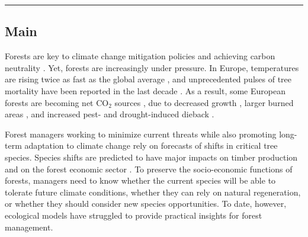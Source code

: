 \documentclass[11pt,letter]{article}
\begin{document}

\noindent\rule{\textwidth}{0.3pt}

\linenumbers

\subsection*{Main}

Forests are key to climate change mitigation policies and achieving carbon neutrality  \citep{Korosuo2023, Hyyrynen2023}. Yet, forests are increasingly under pressure. In Europe, temperatures are rising twice as fast as the global average \citep{CCCS2024}, and unprecedented pulses of tree mortality  have been reported in the last decade \citep{Senf2020}. As a result, some European forests are becoming net CO$_2$ sources \citep{Hadden2016, Karelin2021}, due to decreased growth \citep{Hadden2016, Woude2023}, larger burned areas \citep{Carnicer2022, Kelly2024}, and increased pest- and drought-induced dieback \citep{Karelin2021, Cienciala2024, Latifovic2024}. 

Forest managers working to minimize current threats while also promoting long-term adaptation to climate change rely on forecasts of shifts in critical tree species. Species shifts are predicted to have major impacts on timber production and on the forest economic sector \citep{Wessely2024, Hanewinkel2013}. To preserve the socio-economic functions of forests, managers need to know whether the current species will be able to tolerate future climate conditions, whether they can rely on natural regeneration, or whether they should consider new species opportunities. To date, however, ecological models have struggled to provide practical insights for forest management.
\end{document}
